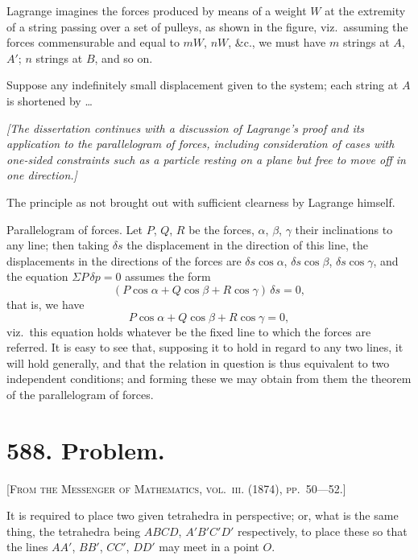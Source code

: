 \documentclass[11pt,a4paper]{article}
\theoremstyle{plain}
\theoremstyle{definition}
\theoremstyle{remark}
\begin{document}
Lagrange imagines the forces produced by means of a weight $W$ at the extremity of a string passing over a set of pulleys, as shown in the figure, viz.\ assuming the forces commensurable and equal to $mW$, $nW$, \&c., we must have $m$ strings at $A$, $A'$; $n$ strings at $B$, and so on.

Suppose any indefinitely small displacement given to the system; each string at $A$ is shortened by \ldots

\smallskip

\textit{[The dissertation continues with a discussion of Lagrange's proof and its application to the parallelogram of forces, including consideration of cases with one-sided constraints such as a particle resting on a plane but free to move off in one direction.]}

\smallskip

The principle as not brought out with sufficient clearness by Lagrange himself.

\smallskip

Parallelogram of forces. Let $P$, $Q$, $R$ be the forces, $\alpha$, $\beta$, $\gamma$ their inclinations to any line; then taking $\delta s$ the displacement in the direction of this line, the displacements in the directions of the forces are $\delta s \cos \alpha$, $\delta s \cos \beta$, $\delta s \cos \gamma$, and the equation $\Sigma P\,\delta p = 0$ assumes the form
\[
(P \cos \alpha + Q \cos \beta + R \cos \gamma)\, \delta s = 0,
\]
that is, we have
\[
P \cos \alpha + Q \cos \beta + R \cos \gamma = 0,
\]
viz.\ this equation holds whatever be the fixed line to which the forces are referred. It is easy to see that, supposing it to hold in regard to any two lines, it will hold generally, and that the relation in question is thus equivalent to two independent conditions; and forming these we may obtain from them the theorem of the parallelogram of forces.

\newpage

\section*{588. Problem.}

\noindent\textsc{[From the Messenger of Mathematics, vol.~\textsc{iii}. (1874), pp.~50---52.]}

\medskip

\noindent It is required to place two given tetrahedra in perspective; or, what is the same thing, the tetrahedra being $ABCD$, $A'B'C'D'$ respectively, to place these so that the lines $AA'$, $BB'$, $CC'$, $DD'$ may meet in a point $O$.
\end{document}
